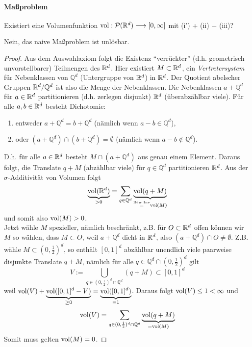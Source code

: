 \paragraph{Maßproblem} Existiert eine Volumenfunktion $\operatorname{vol}: \mathcal{P}(\mathbb{R}^d) \longrightarrow [0,\infty]$ mit (i') + (ii) + (iii)?
\begin{satz}[Vitali, 1905] Nein, das naive Maßproblem ist unlösbar.
\begin{proof}
Aus dem Auswahlaxiom folgt die Existenz ``verrückter'' (d.h. geometrisch unvorstellbarer) Teilmengen des $\mathbb{R}^d$. Hier existiert $M \subset \mathbb{R}^d$, ein \emph{Vertretersystem} für Nebenklassen von $\mathbb{Q}^d$ (Untergruppe von $\mathbb{R}^d$) in $\mathbb{R}^d$. Der Quotient abelscher Gruppen $\mathbb{R}^d/\mathbb{Q}^d$ ist also die Menge der Nebenklassen. Die Nebenklassen $a+\mathbb{Q}^d$ für $a\in \mathbb{R}^d$ partitionieren (d.h. zerlegen disjunkt) $\mathbb{R}^d$ (überabzählbar viele). Für alle $a,b \in \mathbb{R}^d$ besteht Dichotomie:
\begin{enumerate}[label=\roman*),topsep=3pt, itemsep=0pt]
\item entweder $a+\mathbb{Q}^d = b + \mathbb{Q}^d$ (nämlich wenn $a-b \in \mathbb{Q}^d$),
\item oder $(a+\mathbb{Q}^d)\cap (b+\mathbb{Q}^d) = \emptyset$ (nämlich wenn $a-b \notin \mathbb{Q}^d$).
\end{enumerate}
D.h. für alle $a\in \mathbb{R}^d$ besteht $M \cap (a+\mathbb{Q}^d)$ aus genau einem Element. Daraus folgt, die Translate $q+M$ (abzählbar viele) für $q \in \mathbb{Q}^d$ partitionieren $\mathbb{R}^d$. Aus der $\sigma$-Additivität von Volumen folgt
\begin{equation*}
\underbrace{\operatorname{vol} (\mathbb{R}^d)}_{>0}= \sum_{q \in \mathbb{Q}^d} \underbrace{\operatorname{vol} (q+M)}_{\overset{\text{Bew Inv}}{=} \operatorname{vol}(M)}
\end{equation*} 
und somit also $\operatorname{vol} (M)>0$.\\
Jetzt wähle $M$ spezieller, nämlich beschränkt, z.B. für $O\subset \mathbb{R}^d$ offen können wir $M$ so wählen, dass $M\subset O$, weil $a+\mathbb{Q}^d$ dicht in $\mathbb{R}^d$, also $(a+\mathbb{Q}^d)\cap O \neq \emptyset$. Z.B. wähle $M \subset (0,\frac{1}{2})^d$, so enthält $[0,1]^d$ abzählbar unendlich viele paarweise disjunkte Translate $q+M$, nämlich für alle $q\in \mathbb{Q}^d \cap (0,\frac{1}{2})^d$ gilt
\begin{equation*}
V:= \bigcup_{q\in(0,\frac{1}{2})^d \cap \mathbb{Q}^d} (q+M) \subset [0,1]^d
\end{equation*}
weil $\operatorname{vol} (V) + \underbrace{\operatorname{vol} ([0,1]^d-V)}_{\geq 0} = \underbrace{\operatorname{vol} ([0,1]^d)}_{=1}$. Daraus folgt $\operatorname{vol} (V) \leq 1 < \infty$ und 
\begin{equation*}
\operatorname{vol}(V) = \sum_{q\in(0,\frac{1}{2})^d \cap \mathbb{Q}^d} \underbrace{\operatorname{vol} (q+M)}_{=\operatorname{vol}(M)}
\end{equation*}
Somit muss gelten $\operatorname{vol}(M)=0$. \Lightning
\end{proof}
\end{satz}
